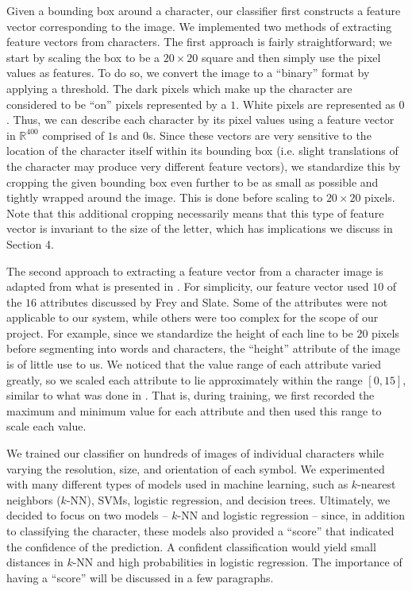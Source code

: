 \documentclass[12pt]{IEEEtran}
\begin{document}
Given a bounding box around a character, our classifier first constructs a feature vector corresponding to the image. We implemented two methods of extracting feature vectors from characters. The first approach is fairly straightforward; we start by scaling the box to be a $20 \times 20$ square and then simply use the pixel values as features. To do so, we convert the image to a ``binary'' format by applying a threshold. The dark pixels which make up the character are considered to be ``on'' pixels represented by a $1$. White pixels are represented as $0$. Thus, we can describe each character by its pixel values using a feature vector in $\mathbb{R}^{400}$ comprised of $1$s and $0$s. Since these vectors are very sensitive to the location of the character itself within its bounding box (i.e. slight translations of the character may produce very different feature vectors), we standardize this by cropping the given bounding box even further to be as small as possible and tightly wrapped around the image. This is done before scaling to $20 \times 20$ pixels. Note that this additional cropping necessarily means that this type of feature vector is invariant to the size of the letter, which has implications we discuss in Section 4.

The second approach to extracting a feature vector from a character image is adapted from what is presented in \cite{2}. For simplicity, our feature vector used $10$ of the $16$ attributes discussed by Frey and Slate. Some of the attributes were not applicable to our system, while others were too complex for the scope of our project. For example, since we standardize the height of each line to be $20$ pixels before segmenting into words and characters, the ``height'' attribute of the image is of little use to us. We noticed that the value range of each attribute varied greatly, so we scaled each attribute to lie approximately within the range $[0,15]$, similar to what was done in \cite{2}. That is, during training, we first recorded the maximum and minimum value for each attribute and then used this range to scale each value.

We trained our classifier on hundreds of images of individual characters while varying the resolution, size, and orientation of each symbol. We experimented with many different types of models used in machine learning, such as $k$-nearest neighbors ($k$-NN), SVMs, logistic regression, and decision trees. Ultimately, we decided to focus on two models -- $k$-NN and logistic regression -- since, in addition to classifying the character, these models also provided a ``score'' that indicated the confidence of the prediction. A confident classification would yield small distances in $k$-NN and high probabilities in logistic regression. The importance of having a ``score'' will be discussed in a few paragraphs.
\end{document}
